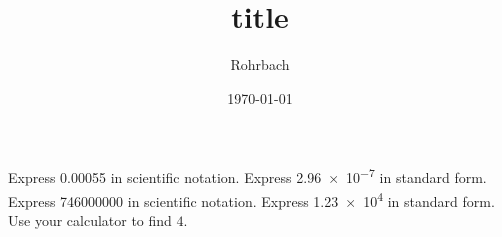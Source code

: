 \documentclass[10pt]{exam}
\title{title}
\author{Rohrbach}
\date{\today}
\begin{document}
\maketitle

\begin{questions}
  \question Express \SI{0.00055}{} in scientific notation.
  \question Express \SI{2.96e-7}{} in standard form.
  \question Express \SI{746000000}{} in scientific notation.
  \question Express \SI{1.23e4}{} in standard form.
  \question Use your calculator to find $4$.
  
\end{questions}
\end{document}
